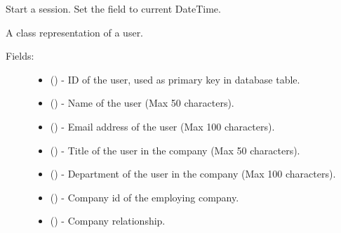 \documentclass[letterpaper,10pt,english]{sphinxmanual}
\begin{document}
\begin{fulllineitems}
\begin{fulllineitems}
\end{fulllineitems}


\begin{fulllineitems}
\label{api:models.Session.start}
Start a session. Set the  field to current DateTime.

\end{fulllineitems}


\end{fulllineitems}


\begin{fulllineitems}
\label{api:models.User}
A class representation of a user.
\begin{description}
\item[{Fields:}] \leavevmode\begin{itemize}
\item {} 
 () - ID of the user, used as primary key in database table.

\item {} 
 () - Name of the user (Max 50 characters).

\item {} 
 () - Email address of the user (Max 100 characters).

\item {} 
 () - Title of the user in the company (Max 50 characters).

\item {} 
 () - Department of the user in the company (Max 100 characters).

\item {} 
 () - Company id of the employing company.

\item {} 
 () - Company relationship.

\end{itemize}


\end{description}
\end{fulllineitems}
\end{document}
